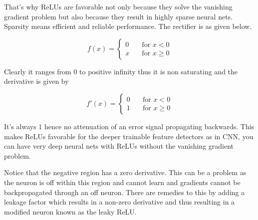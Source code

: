 \documentclass{article}
\begin{document}
That's why ReLUs are favorable not only because they solve the vanishing gradient problem but also because they result in highly sparse neural nets. Sparsity means efficient and reliable performance. The rectifier is as given below.

\[ f(x) = 
\begin{cases}
    0  & \quad \text{for } x < 0\\
    x  & \quad \text{for } x \geq 0
  \end{cases}
\]

Clearly it ranges from 0 to positive infinity thus it is non saturating and the derivative is given by

\[ f'(x) = 
\begin{cases}
    0  & \quad \text{for } x < 0\\
    1  & \quad \text{for } x \geq 0
  \end{cases}
\]


It's always $1$ hence no attenuation of an error signal propagating backwards. This makes ReLUs favorable for the deeper trainable feature detectors as in CNN, you can have very deep neural nets with ReLUs without the vanishing gradient problem.

Notice that the negative region has a zero derivative. This can be a problem as the neuron is off within this region and cannot learn and gradients cannot be backpropagated through an off neuron. There are remedies to this by adding a leakage factor which results in a non-zero derivative and thus resulting in a modified neuron known as the leaky ReLU.
\end{document}
